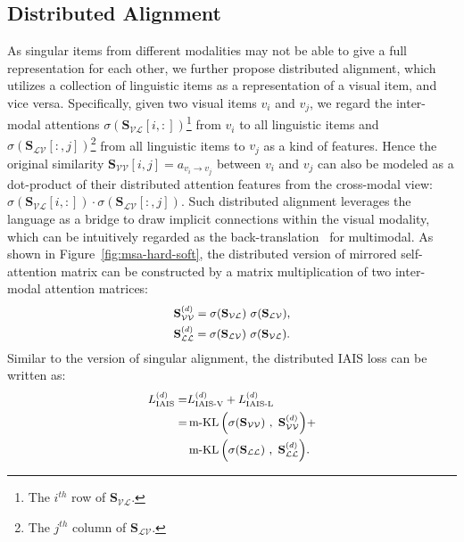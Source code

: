 \documentclass[11pt,a4paper]{article}
\begin{document}
 \subsection{Distributed Alignment}
As singular items from different modalities may not be able to give a full representation for each other, we further propose distributed alignment, which utilizes a collection of linguistic items as a representation of a visual item, and vice versa. 
Specifically, given two visual items $v_i$ and $v_j$, we regard the inter-modal attentions $\sigma(\mathbf{S}_{\mathcal{VL}}[i,:])$\footnote{The $i^{th}$ row of $\mathbf{S}_{\mathcal{VL}}$.} from $v_i$ to all linguistic items and $\sigma(\mathbf{S}_{\mathcal{LV}}[:,j])$\footnote{The $j^{th}$ column of $\mathbf{S}_{\mathcal{LV}}$.} from all linguistic items to $v_j$ as a kind of features. 
Hence the original similarity $\mathbf{S}_{\mathcal{VV}}[i,j]=a_{v_i \rightarrow v_j}$ between $v_i$ and $v_j$ can also be modeled as a dot-product of their distributed attention features from the cross-modal view: $\sigma(\mathbf{S}_{\mathcal{VL}}[i,:]) \cdot \sigma(\mathbf{S}_{\mathcal{LV}}[:,j])$.
Such distributed alignment leverages the language as a bridge to draw implicit connections within the visual modality, which can be intuitively regarded as the back-translation~\cite{improving-MT} for multimodal. 
As shown in Figure~\ref{fig:msa-hard-soft}, the distributed version of mirrored self-attention matrix can be constructed by a matrix multiplication of two inter-modal attention matrices:
\begin{equation}
\small
\begin{split}
    & \mathbf{S}_{\mathcal{VV}}^{(d)} = \sigma(\mathbf{S}_{\mathcal{V} \mathcal{L}}) ~ \sigma(\mathbf{S}_{\mathcal{L} \mathcal{V}}), \\
    & \mathbf{S}_{\mathcal{LL}}^{(d)} = \sigma(\mathbf{S}_{\mathcal{L} \mathcal{V}}) ~ \sigma(\mathbf{S}_{\mathcal{V} \mathcal{L}}).
\end{split}
\end{equation}
Similar to the version of singular alignment, the distributed IAIS loss can be written as: 
\begin{equation}
\small
\begin{split}
    L^{(d)}_\text{IAIS} = & L^{(d)}_\text{IAIS-V} + L^{(d)}_\text{IAIS-L} \\ 
    = & \operatorname{m-KL} \Big ( \sigma(\mathbf{S}_{\mathcal{VV}})~,~ \mathbf{S}_{\mathcal{VV}}^{(d)} \Big ) + \\
    & \operatorname{m-KL} \Big ( \sigma(\mathbf{S}_{\mathcal{LL}})~,~ \mathbf{S}_{\mathcal{LL}}^{(d)} \Big ).
\end{split}
\label{equ:soft-alignment}
\end{equation}
\end{document}
